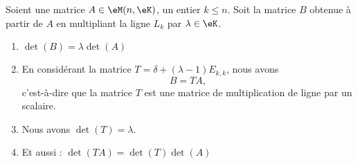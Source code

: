 \begin{proposition} \label{PROPooXUFKooOaPnna}
	Soient une matrice \( A\in \eM(n,\eK)\), un entier \( k\leq n\). Soit la matrice \( B\) obtenue à partir de \( A\) en multipliant la ligne \( L_k\) par \( \lambda\in \eK\).
	\begin{enumerate}
		\item       \label{ITEMooBKIGooCDQEDt}
		      \( \det(B)=\lambda\det(A)\)
		\item       \label{ITEMooWRRCooFXkRNW}
		      En considérant la matrice \( T=\delta+(\lambda-1)E_{k,k}\), nous avons
		      \begin{equation}
			      B=TA,
		      \end{equation}
		      c'est-à-dire que la matrice \( T\) est une matrice de multiplication de ligne par un scalaire.
		\item       \label{ITEMooOGGDooPVVRzk}
		      Nous avons \( \det(T)=\lambda\).
		\item       \label{ITEMooIFRVooWQYgkK}
		      Et aussi : \( \det(TA)=\det(T)\det(A)\)
	\end{enumerate}
\end{proposition}

